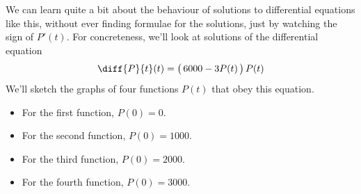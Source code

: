 
We can learn quite a bit about the behaviour of solutions to differential
equations like this, without ever finding formulae for the solutions,
just by watching the sign of $P'(t)$. For concreteness,
we'll look at solutions of the differential equation
\begin{align*}
  \diff{P}{t}(t)=\big(\,6000-3P(t)\,\big)\,P(t)
\end{align*}
We'll sketch the graphs of four functions $P(t)$ that obey this equation.
\begin{itemize} \itemsep1pt \parskip0pt
  \item    For the first function, $P(0)=0$.
  \item    For the second function, $P(0)=1000$.
  \item    For the third function, $P(0)=2000$.
  \item    For the fourth function, $P(0)=3000$.
\end{itemize}

